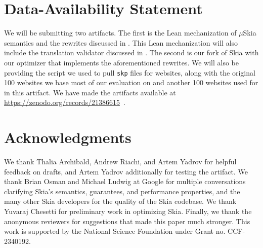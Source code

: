 \documentclass[acmsmall]{acmart}
\newcommand{\muskia}{$\mu$\textsf{Skia}\xspace}
\begin{document}
\section*{Data-Availability Statement}
We will be submitting two artifacts.
The first is the Lean mechanization of
  \muskia semantics and the rewrites discussed in .
This Lean mechanization will also include the translation validator discussed in
  .
The second is our fork of Skia with our optimizer
  that implements the aforementioned rewrites.
We will also be providing the script we used to pull \texttt{skp} files for
  websites, along with the original 100 websites we base most of our evaluation on
  and another 100 websites used for  in this artifact.
We have made the artifacts available at \mbox{\url{https://zenodo.org/records/21386615}~\cite{artifact}}.

\section*{Acknowledgments}
We thank Thalia Archibald, Andrew Riachi, and Artem Yadrov for helpful feedback on drafts, and Artem
Yadrov additionally for testing the artifact.
We thank Brian Osman and Michael Ludwig at Google for multiple conversations clarifying Skia's
semantics, guarantees, and performance properties, and the many other Skia developers for the
quality of the Skia codebase.
We thank Yuvaraj Chesetti for preliminary work in optimizing Skia.
Finally, we thank the anonymous reviewers for suggestions that made this paper much stronger.
This work is supported by the National Science Foundation under Grant no. CCF-2340192.




\end{document}
